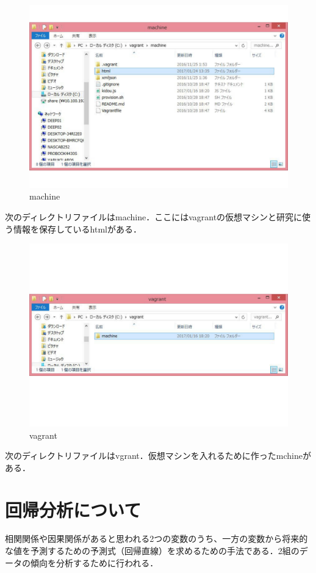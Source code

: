 \begin{figure}[htb]
\centering
\includegraphics[width=12cm]{fairu04.pdf}
\caption{machine}\label{ace}
\end{figure}

\clearpage

次のディレクトリファイルはmachine．ここにはvagrantの仮想マシンと研究に使う情報を保存しているhtmlがある．

\clearpage

\begin{figure}[htb]
\centering
\includegraphics[width=14cm]{fairu05.pdf}
\caption{vagrant}\label{ace}
\end{figure}


次のディレクトリファイルはvgrant．仮想マシンを入れるために作ったmchineがある．

\clearpage

\chapter{回帰分析について}
相関関係や因果関係があると思われる2つの変数のうち、一方の変数から将来的な値を予測するための予測式（回帰直線）を求めるための手法である．2組のデータの傾向を分析するために行われる．

